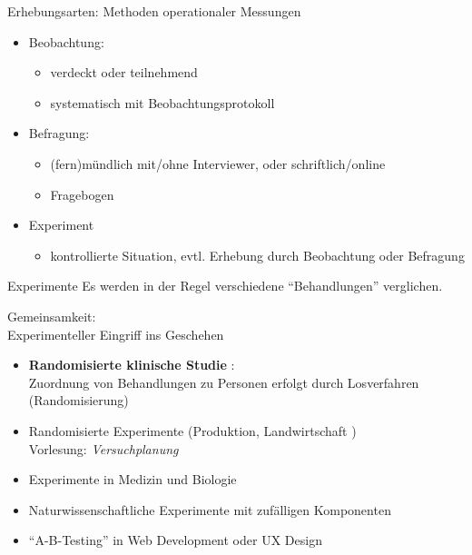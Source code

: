 \documentclass[
  10pt,
  ignorenonframetext,
]{beamer}
\providecommand{\tightlist}{%
  \setlength{\itemsep}{0pt}\setlength{\parskip}{0pt}}
\begin{document}
\begin{frame}{Erhebungsarten: Methoden operationaler Messungen}
\protect\hypertarget{erhebungsarten-methoden-operationaler-messungen}{}
\begin{itemize}
\tightlist
\item
  Beobachtung:

  \begin{itemize}
  \tightlist
  \item
    verdeckt oder teilnehmend
  \item
    systematisch mit Beobachtungsprotokoll
  \end{itemize}
\item
  Befragung:

  \begin{itemize}
  \tightlist
  \item
    (fern)mündlich mit/ohne Interviewer, oder schriftlich/online
  \item
    Fragebogen
  \end{itemize}
\item
  Experiment

  \begin{itemize}
  \tightlist
  \item
    kontrollierte Situation, evtl. Erhebung durch Beobachtung oder
    Befragung
  \end{itemize}
\end{itemize}
\end{frame}

\begin{frame}{Experimente}
\protect\hypertarget{experimente}{}
Es werden in der Regel verschiedene ``Behandlungen'' verglichen.

Gemeinsamkeit:\\
Experimenteller Eingriff ins Geschehen

\begin{itemize}
\tightlist
\item
  \textbf{Randomisierte klinische Studie} :\\
  Zuordnung von Behandlungen zu Personen erfolgt durch Losverfahren
  (Randomisierung)
\item
  Randomisierte Experimente (Produktion, Landwirtschaft )\\
  Vorlesung: \emph{Versuchplanung}
\item
  Experimente in Medizin und Biologie
\item
  Naturwissenschaftliche Experimente mit zufälligen Komponenten
\item
  ``A-B-Testing'' in Web Development oder UX Design
\end{itemize}
\end{frame}
\end{document}
